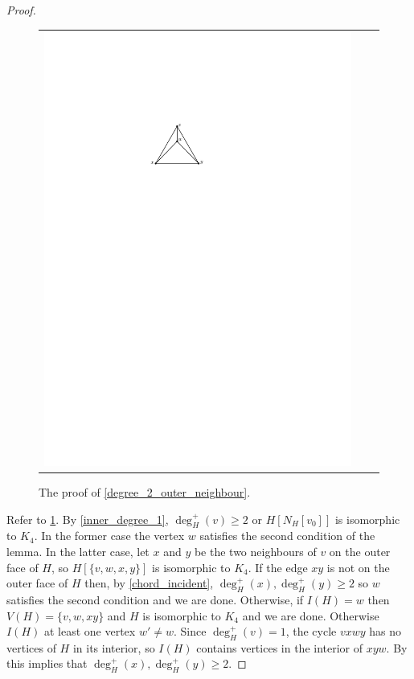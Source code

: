 \documentclass[12pt]{article}
\theoremstyle{definition}
\newcommand{\pat}[1]{[\textcolor{red}{PM: #1}]}
\begin{document}
\begin{proof}
\begin{figure}[htbp]
\begin{tabular}{ccc}
       \includegraphics[page=3]{figs/outer_2_2}
     \end{tabular}
     \caption{The proof of \cref{degree_2_outer_neighbour}.}
     \label{degree_2_outer_neighbour_fig}
   \end{figure}

   Refer to \cref{degree_2_outer_neighbour_fig}.
   By \cref{inner_degree_1}, $\deg^+_H(v)\ge 2$ or $H[N_H[v_0]]$ is isomorphic to $K_4$. In the former case the vertex $w$ satisfies the second condition of the lemma.  In the latter case, let $x$ and $y$ be the two neighbours of $v$ on the outer face of $H$, so $H[\{v,w,x,y\}]$ is isomorphic to $K_4$.    If the edge $xy$ is not on the outer face of $H$ then, by \cref{chord_incident}, $\deg^+_H(x),\deg^+_H(y)\ge 2$ so $w$ satisfies the second condition and we are done.  Otherwise, if $I(H)=w$ then $V(H)=\{v,w,xy\}$ and $H$ is isomorphic to $K_4$ and we are done.  Otherwise $I(H)$ at least one vertex $w'\neq w$.  Since $\deg^+_H(v)=1$, the cycle $vxwy$ has no vertices of $H$ in its interior, so $I(H)$ contains vertices in the interior of $xyw$.  By this implies that $\deg^+_H(x),\deg^+_H(y)\ge 2$.
\end{proof}
\end{document}
